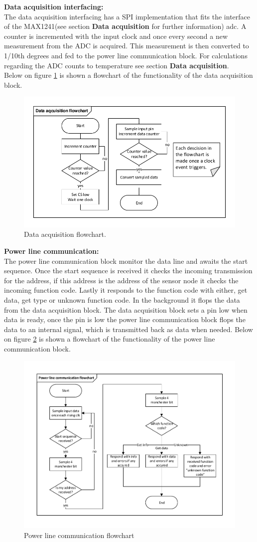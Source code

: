 \textbf{Data acquisition interfacing:}\\
The data acquisition interfacing has a SPI implementation that fits the interface of the MAX1241(see section \textbf{Data acquisition} for further information) adc. A counter is incremented with the input clock and once every second a new measurement from the ADC is acquired. This measurement is then converted to 1/10th degrees and fed to the power line communication block. For calculations regarding the ADC counts to temperature see section \textbf{Data acquisition}.\\
Below on figure \ref{fig:data_acq} is shown a flowchart of the functionality of the data acquisition block.

\begin{figure}[H]
	\centering
	\includegraphics[width=.6\textwidth]{billeder/data_aqc_flowchart}
	\caption{Data acquisition flowchart.}
	\label{fig:data_acq}
\end{figure}

\textbf{Power line communication:}\\
The power line communication block monitor the data line and awaits the start sequence. Once the start sequence is received it checks the incoming transmission for the address, if this address is the address of the sensor node it checks the incoming function code. Lastly it responds to the function code with either, get data, get type or unknown function code. In the background it flops the data from the data acquisition block. The data acquisition block sets a pin low when data is ready, once the pin is low the power line communication block flops the data to an internal signal, which is transmitted back as data when needed. Below on figure \ref{fig:powerline_flow} is shown a flowchart of the functionality of the power line communication block.

\begin{figure}[H]
	\centering
	\includegraphics[width=.6\textwidth]{billeder/powerline_communication_flowchart}
	\caption{Power line communication flowchart}
	\label{fig:powerline_flow}
\end{figure}


